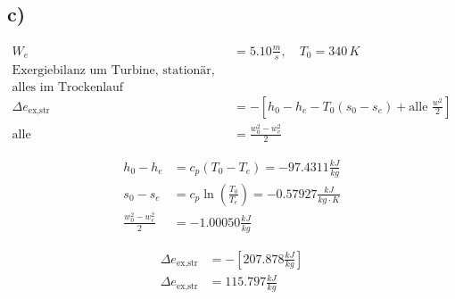 

\subsection*{c)}

\begin{align*}
W_e &= 5.10 \frac{m}{s}, \quad T_0 = 340 \, K \\
\text{Exergiebilanz um Turbine, stationär, 1 massenstrom:} \\
\text{alles im Trockenlauf} \\
\Delta e_{\text{ex,str}} &= -\left[ h_0 - h_e - T_0 \left( s_0 - s_e \right) + \text{alle } \frac{w^2}{2} \right] \\
\text{alle} &= \frac{w_0^2 - w_e^2}{2}
\end{align*}

\begin{align*}
h_0 - h_e &= c_p \left( T_0 - T_e \right) = -97.4311 \frac{kJ}{kg} \\
s_0 - s_e &= c_p \ln \left( \frac{T_0}{T_e} \right) = -0.57927 \frac{kJ}{kg \cdot K} \\
\frac{w_0^2 - w_e^2}{2} &= -1.00050 \frac{kJ}{kg}
\end{align*}

\begin{align*}
\Delta e_{\text{ex,str}} &= -\left[ 207.878 \frac{kJ}{kg} \right] \\
\Delta e_{\text{ex,str}} &= 115.797 \frac{kJ}{kg}
\end{align*}
